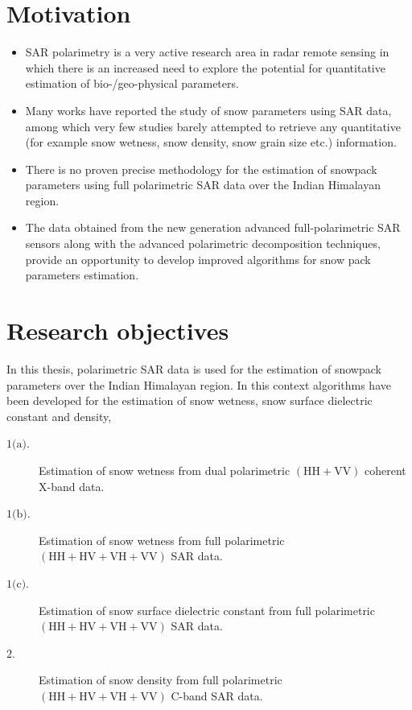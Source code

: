 \section{Motivation}
\begin{itemize}
	\item SAR polarimetry is a very active research area in radar remote sensing in which there is an increased need to explore the potential for quantitative estimation of bio-/geo-physical parameters.
	
	\item Many works have reported the study of snow parameters using SAR data, among which very few studies barely attempted to retrieve any quantitative (for example snow wetness, snow density, snow grain size etc.) information.
	
	\item There is no proven precise methodology for the estimation of snowpack parameters using full polarimetric SAR data over the Indian Himalayan region. 
	
	\item The data obtained from the new generation advanced full-polarimetric SAR sensors along with the advanced polarimetric decomposition techniques, provide an opportunity to develop improved algorithms for snow pack parameters estimation. 
	
\end{itemize}
\section{Research objectives}
In this thesis, polarimetric SAR data is used for the estimation of snowpack parameters over the Indian Himalayan region. In this context algorithms have been developed for the estimation of snow wetness, snow surface dielectric constant and density,
\begin{description}
	\item[$\mbox{1(a)}.$ ] Estimation of snow wetness from dual polarimetric $(\mbox{HH}+\mbox{VV})$ coherent X-band data.
	\item[$\mbox{1(b)}.$ ] Estimation of snow wetness from full polarimetric $(\mbox{HH}+\mbox{HV}+\mbox{VH}+\mbox{VV})$ SAR data.
	\item[$\mbox{1(c)}.$ ] Estimation of snow surface dielectric constant from full polarimetric $(\mbox{HH}+\mbox{HV}+\mbox{VH}+\mbox{VV})$ SAR data.
	\item[$\mbox{2}.   $ ] Estimation of snow density from full polarimetric $(\mbox{HH}+\mbox{HV}+\mbox{VH}+\mbox{VV})$ C-band SAR data.
\end{description}

